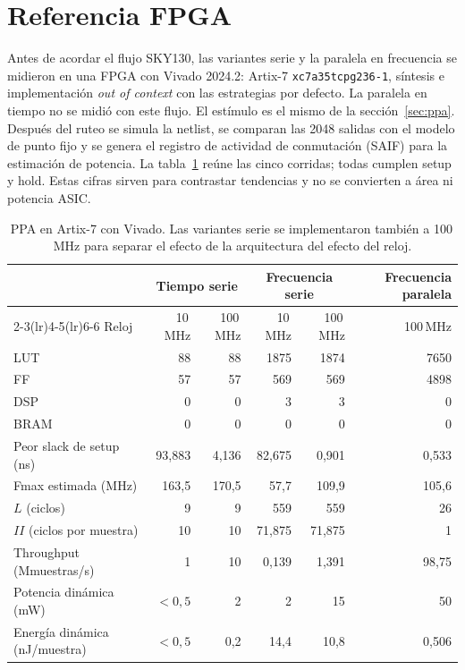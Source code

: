 \section{Referencia FPGA}\label{app:fpga}

Antes de acordar el flujo SKY130, las variantes serie y la paralela en frecuencia se midieron en una FPGA con Vivado 2024.2: Artix-7 \texttt{xc7a35tcpg236-1}, síntesis e implementación \emph{out of context} con las estrategias por defecto. La paralela en tiempo no se midió con este flujo. El estímulo es el mismo de la sección~\ref{sec:ppa}. Después del ruteo se simula la netlist, se comparan las 2048 salidas con el modelo de punto fijo y se genera el registro de actividad de conmutación (SAIF) para la estimación de potencia. La tabla~\ref{tab:fpga} reúne las cinco corridas; todas cumplen setup y hold. Estas cifras sirven para contrastar tendencias y no se convierten a área ni potencia ASIC.

\begin{table}[h]
  \centering
  \caption{PPA en Artix-7 con Vivado. Las variantes serie se implementaron también a 100\,MHz para separar el efecto de la arquitectura del efecto del reloj.}\label{tab:fpga}
  \small
  \begin{tabular}{lrrrrr}
    \toprule
    & \multicolumn{2}{c}{Tiempo serie} & \multicolumn{2}{c}{Frecuencia serie} & Frecuencia paralela \\
    \cmidrule(lr){2-3}\cmidrule(lr){4-5}\cmidrule(lr){6-6}
    Reloj & 10\,MHz & 100\,MHz & 10\,MHz & 100\,MHz & 100\,MHz \\
    \midrule
    LUT & 88 & 88 & 1875 & 1874 & 7650 \\
    FF & 57 & 57 & 569 & 569 & 4898 \\
    DSP & 0 & 0 & 3 & 3 & 0 \\
    BRAM & 0 & 0 & 0 & 0 & 0 \\
    Peor slack de setup (ns) & 93,883 & 4,136 & 82,675 & 0,901 & 0,533 \\
    Fmax estimada (MHz) & 163,5 & 170,5 & 57,7 & 109,9 & 105,6 \\
    $L$ (ciclos) & 9 & 9 & 559 & 559 & 26 \\
    $II$ (ciclos por muestra) & 10 & 10 & 71,875 & 71,875 & 1 \\
    Throughput (Mmuestras/s) & 1 & 10 & 0,139 & 1,391 & 98,75 \\
    Potencia dinámica (mW) & $<0{,}5$ & 2 & 2 & 15 & 50 \\
    Energía dinámica (nJ/muestra) & $<0{,}5$ & 0,2 & 14,4 & 10,8 & 0,506 \\
    \bottomrule
  \end{tabular}
\end{table}

